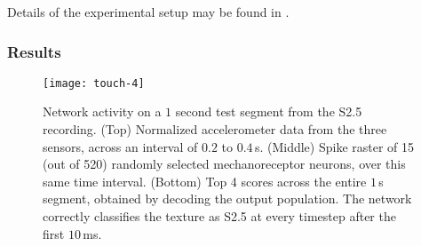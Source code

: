 Details of the experimental setup may be found in \citet{voelker2016a}.

\subsubsection{Results}

\begin{figure}[!htb]
    \centering
    \vspace{1pt}
    \texttt{[image: touch-4]}
    \caption{\label{fig:touch-raster} Network activity on a $1$ second test segment from the S2.5 %
recording. (Top) Normalized accelerometer data from the three sensors, across an interval of $0.2$ to $0.4$\,s. (Middle) Spike raster of 15 (out of 520) randomly selected mechanoreceptor neurons, over this same time interval. (Bottom) Top 4 scores across the entire $1$\,s segment, obtained by decoding the output population. The network correctly classifies the texture as S2.5 at every timestep after the first $10$\,ms.
}
\end{figure}

